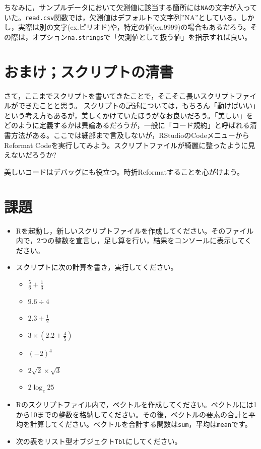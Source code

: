 \documentclass[
  a4paper,
]{ltjsbook}
\providecommand{\tightlist}{%
  \setlength{\itemsep}{0pt}\setlength{\parskip}{0pt}}
\begin{document}
ちなみに，サンプルデータにおいて欠測値に該当する箇所には\texttt{NA}の文字が入っていた。\texttt{read.csv}関数では，欠測値はデフォルトで文字列''NA''としている。しかし，実際は別の文字(ex.ピリオド)や，特定の値(ex.9999)の場合もあるだろう。その際は，オプション\texttt{na.strings}で「欠測値として扱う値」を指示すれば良い。

\section{おまけ；スクリプトの清書}\label{ux304aux307eux3051ux30b9ux30afux30eaux30d7ux30c8ux306eux6e05ux66f8}

さて，ここまでスクリプトを書いてきたことで，そこそこ長いスクリプトファイルができたことと思う。
スクリプトの記述については，もちろん「動けばいい」という考え方もあるが，美しくかけていたほうがなお良いだろう。「美しい」をどのように定義するかは異論あるだろうが，一般に「コード規約」と呼ばれる清書方法がある。ここでは細部まで言及しないが，RStudioのCodeメニューからReformat
Codeを実行してみよう。スクリプトファイルが綺麗に整ったように見えないだろうか?

美しいコードはデバッグにも役立つ。時折Reformatすることを心がけよう。

\section{課題}\label{ux8ab2ux984c-1}

\begin{itemize}
\item
  Rを起動し，新しいスクリプトファイルを作成してください。そのファイル内で，2つの整数を宣言し，足し算を行い，結果をコンソールに表示してください。
\item
  スクリプトに次の計算を書き，実行してください。

  \begin{itemize}
  \tightlist
  \item
    \(\frac{5}{6} + \frac{1}{3}\)
  \item
    \(9.6 \div 4\)
  \item
    \(2.3 + \frac{1}{2}\)
  \item
    \(3\times (2.2 + \frac{4}{5})\)
  \item
    \((-2)^4\)
  \item
    \(2\sqrt{2} \times \sqrt{3}\)
  \item
    \(2\log_e 25\)
  \end{itemize}
\item
  Rのスクリプトファイル内で，ベクトルを作成してください。ベクトルには1から10までの整数を格納してください。その後，ベクトルの要素の合計と平均を計算してください。ベクトルを合計する関数は\texttt{sum}，平均は\texttt{mean}です。
\item
  次の表をリスト型オブジェクト\texttt{Tbl}にしてください。
\end{itemize}
\end{document}
